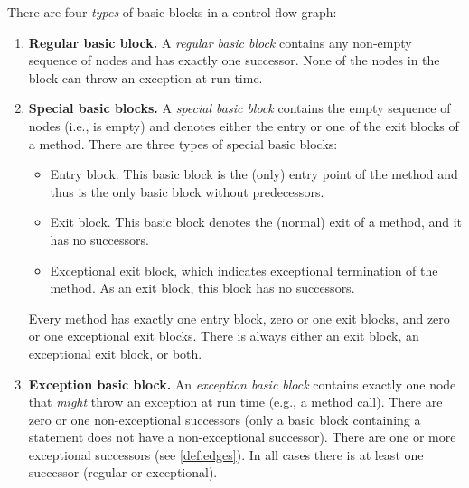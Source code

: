 \begin{definition}
    There are four \emph{types} of basic blocks in a control-flow graph:
    \begin{enumerate}
        \item \textbf{Regular basic block.} A \emph{regular basic
          block} contains any non-empty sequence of nodes and has
          exactly one successor.  None of the nodes in the block can
          throw an exception at run time.

        \item \textbf{Special basic blocks.} A \emph{special basic
          block} contains the empty sequence of nodes (i.e., is empty)
          and denotes either the entry or one of the exit blocks of a
          method. There are three types of special basic blocks:
        \begin{itemize}
            \item Entry block. This basic block is the (only) entry
              point of the method and thus is the only basic block
              without predecessors.
            \item Exit block. This basic block denotes the (normal)
              exit of a method, and it has no successors.
            \item Exceptional exit block, which indicates exceptional
              termination of the method. As an exit block, this block
              has no successors.
        \end{itemize}
        Every method has exactly one entry block, zero or one exit blocks,
        and zero or one exceptional exit blocks. There is always
        either an exit block, an exceptional exit block, or both.

        \item \textbf{Exception basic block.} An \emph{exception basic
          block} contains exactly one node that \emph{might} throw an
          exception at run time (e.g., a method call).  There are zero
          or one non-exceptional successors (only a basic block containing a
           statement does not have a non-exceptional
          successor).  There are one or more
          exceptional successors (see \autoref{def:edges}). In all
          cases there is at least one successor (regular or
          exceptional).


\end{enumerate}
\end{definition}
